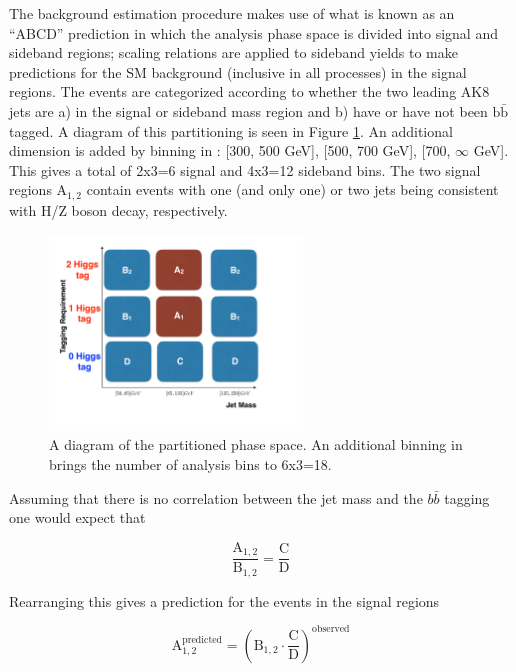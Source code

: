 The background estimation procedure makes use of what is known as an ``ABCD'' prediction in which the analysis phase space is divided into signal and sideband regions; scaling relations are applied to sideband yields to make predictions for the SM background (inclusive in all processes) in the signal regions. The events are categorized according to whether the two leading AK8 jets are a) in the signal or sideband mass region and b) have or have not been $\mathrm{b}\bar{\mathrm{b}}$ tagged.  A diagram of this partitioning is seen in Figure \ref{fig:abcd}. An additional dimension is added by binning in \ptmiss: [300, 500 GeV], [500, 700 GeV], [700, $\infty$ GeV]. This gives a total of 2x3=6 signal and 4x3=12 sideband bins. The two signal regions $\mathrm{A}_{1, 2}$ contain events with one (and only one) or two jets being consistent with H/Z boson decay, respectively.

\begin{figure}[hbp!]
\centering
\includegraphics[width=0.6\textwidth]{figs/CMS-SUS-17-006_Figure-aux_002.pdf}
\caption{A diagram of the partitioned phase space. An additional binning in \ptmiss brings the number of analysis bins to 6x3=18.}
\label{fig:abcd}
\end{figure}

Assuming that there is no correlation between the jet mass and the $b\bar{b}$ tagging one would expect that

\begin{equation}
\frac{\mathrm{A}_{1, 2}}{\mathrm{B}_{1, 2}} = \frac{\mathrm{C}}{\mathrm{D}}
\end{equation}

Rearranging this gives a prediction for the events in the signal regions

\begin{equation}
\mathrm{A}_{1, 2}^{\mathrm{predicted}} = (\mathrm{B}_{1, 2} \cdot \frac{\mathrm{C}}{\mathrm{D}})^{\mathrm{observed}}
\end{equation}

